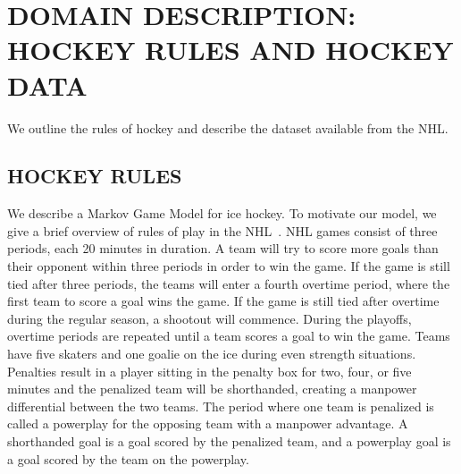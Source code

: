 \documentclass[]{article}
\begin{document}
%
%



\section{DOMAIN DESCRIPTION: HOCKEY RULES AND HOCKEY DATA}
\label{sec:background-notation}

We outline the rules of hockey and describe the dataset available from the NHL.

\subsection{HOCKEY RULES}
We describe a Markov Game Model for ice hockey. To motivate our model, we give a brief overview of rules of play in the NHL~\citep{NHL2014}. NHL games consist of three periods, each 20 minutes in duration. A team will try to score more goals than their opponent within three periods in order to win the game. If the game is still tied after three periods, the teams will enter a fourth overtime period, where the first team to score a goal wins the game. If the game is still tied after overtime during the regular season, a shootout will commence. During the playoffs, overtime periods are repeated until a team scores a goal to win the game. Teams have five skaters and one goalie on the ice during even strength situations.
Penalties result in a player sitting in the penalty box for two, four, or five minutes and the penalized team will be shorthanded, creating a manpower differential between the two teams.
The period where one team is penalized is called a powerplay for the opposing team with a manpower advantage.
A shorthanded goal is a goal scored by the penalized team, and a powerplay goal is a goal scored by the team on the powerplay.
\end{document}
